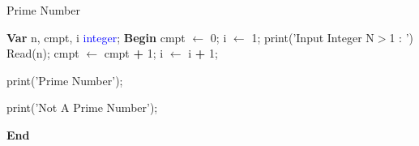 \begin{algorithm}
\caption{Prime Number}
\begin{algorithmic}[1]
\State \textbf{\textcolor{redPlot}{Var}}
\State n, cmpt, i \textcolor{blue}{integer};
\vspace{0.5em}
\State  \textbf{\textcolor{redPlot}{Begin}}
\State cmpt $\gets$ 0; 
\State  i $\gets$ 1;
\vspace{0.5em}
\State \textcolor{purplePlot!80!black}{print}(\textcolor{blueArea!60!black}{'Input Integer N\(>\)1 : '}) 
\State \textcolor{purplePlot!80!black}{Read}(n);
\vspace{0.5em}
\State cmpt $\gets$ cmpt \textcolor{redPlot}{ \textbf{+}} 1;
\EndIf
\State i $\gets$ i \textcolor{redPlot}{ \textbf{+}} 1; 
\EndWhile

\vspace{0.5em}


\State \textcolor{purplePlot!80!black}{print}(\textcolor{blueArea!60!black}{'Prime Number'});

\Else

\State \textcolor{purplePlot!80!black}{print}(\textcolor{blueArea!60!black}{'Not A Prime Number'});

\EndIf

\vspace{0.5em}
\State  \textbf{\textcolor{redPlot}{End}}
\end{algorithmic}
\end{algorithm}

